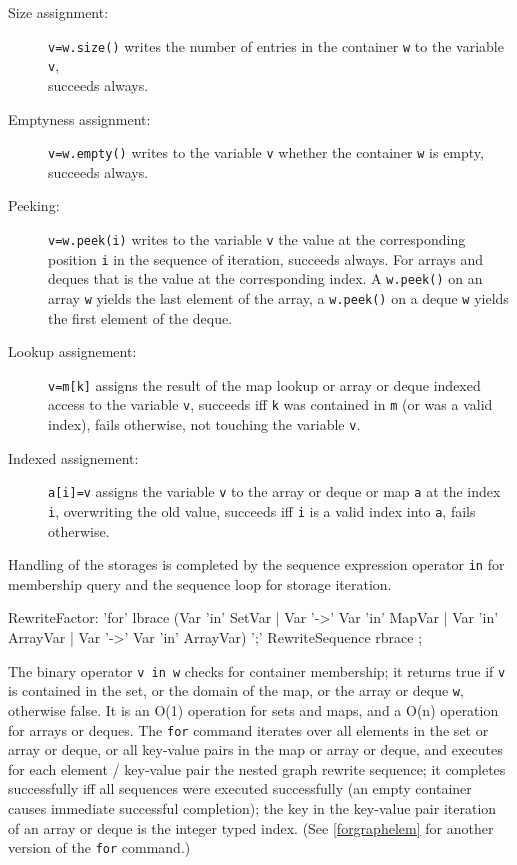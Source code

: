 \begin{description}
\item[Size assignment:] \texttt{v=w.size()} writes the number of entries in the container \texttt{w} to the variable \texttt{v},\\succeeds always.
\item[Emptyness assignment:] \texttt{v=w.empty()} writes to the variable \texttt{v} whether the container \texttt{w} is empty, succeeds always.
\item[Peeking:] \texttt{v=w.peek(i)} writes to the variable \texttt{v} the value at the corresponding position \texttt{i} in the sequence of iteration, succeeds always. For arrays and deques that is the value at the corresponding index. A \texttt{w.peek()} on an array \texttt{w} yields the last element of the array, a \texttt{w.peek()} on a deque \texttt{w} yields the first element of the deque.
\item[Lookup assignement:] \texttt{v=m[k]} assigns the result of the map lookup or array or deque indexed access to the variable \texttt{v}, succeeds iff \texttt{k} was contained in \texttt{m} (or was a valid index), fails otherwise, not touching the variable \texttt{v}.
\item[Indexed assignement:] \texttt{a[i]=v} assigns the variable \texttt{v} to the array or deque or map \texttt{a} at the index \texttt{i}, overwriting the old value, succeeds iff \texttt{i} is a valid index into \texttt{a}, fails otherwise.
\end{description}

\noindent Handling of the storages is completed by the sequence expression operator \texttt{in} for membership query and the sequence loop for storage iteration.

\begin{rail}
  RewriteFactor:
    'for' lbrace (Var 'in' SetVar | Var '->' Var 'in' MapVar | Var 'in' ArrayVar | Var '->' Var 'in' ArrayVar) ';' RewriteSequence rbrace
    ;
\end{rail}\label{forstorage}

The binary operator \texttt{v in w} checks for container membership; it returns true if \texttt{v} is contained in the set, or the domain of the map, or the array or deque \texttt{w}, otherwise false.
It is an O(1) operation for sets and maps, and a O(n) operation for arrays or deques.
The \texttt{for} command iterates over all elements in the set or array or deque, or all key-value pairs in the map or array or deque, and executes for each element / key-value pair the nested graph rewrite sequence; it completes successfully iff all sequences were executed successfully (an empty container causes immediate successful completion); the key in the key-value pair iteration of an array or deque is the integer typed index. (See \ref{forgraphelem} for another version of the \texttt{for} command.)

